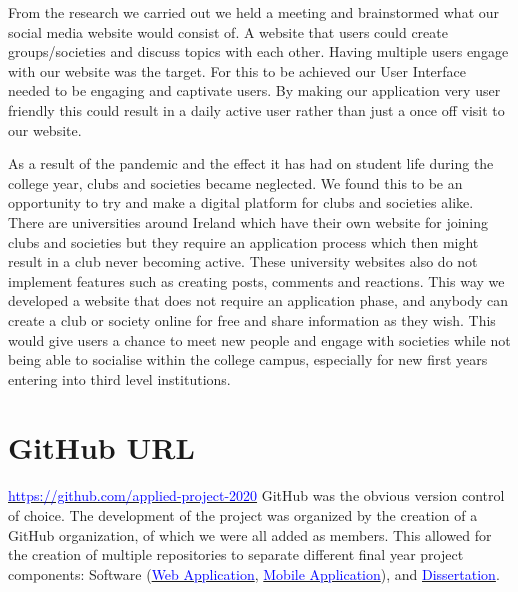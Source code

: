 From the research we carried out we held a meeting and brainstormed what our social media website would consist of. A website that users could create groups/societies and discuss topics with each other. Having multiple users engage with our website was the target. For this to be achieved our User Interface needed to be engaging and captivate users. By making our application very user friendly this could result in a daily active user rather than just a once off visit to our website.
\newline 

As a result of the pandemic and the effect it has had on student life during the college year, clubs and societies became neglected. We found this to be an opportunity to try and make a digital platform for clubs and societies alike. There are universities around Ireland which have their own website for joining clubs and societies but they require an application process which then might result in a club never becoming active. These university websites also do not implement features such as creating posts, comments and reactions. This way we developed a website that does not require an application phase, and anybody can create a club or society online for free and share information as they wish. This would give users a chance to meet new people and engage with societies while not being able to socialise within the college campus, especially for new first years entering into third level institutions.
\newline

\section{GitHub URL}
\href{https://github.com/applied-project-2020}{\textcolor{blue}{https://github.com/applied-project-2020}}
GitHub was the obvious version control of choice. The development of the project was organized by the creation of a GitHub organization, of which we were all added as members. This allowed for the creation of multiple repositories to separate different final year project components: Software (\href{https://github.com/applied-project-2020/zoosh}{\textcolor{blue}{Web Application}}, \href{https://github.com/applied-project-2020/mobile-application}{\textcolor{blue}{Mobile Application}}), and \href{https://github.com/applied-project-2020/documentation}{\textcolor{blue}{Dissertation}}.

